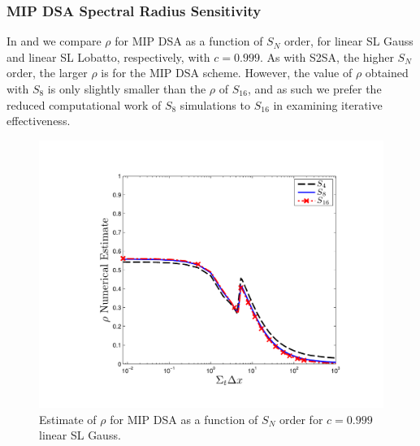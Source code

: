 \newpage

\subsubsection{MIP DSA Spectral Radius Sensitivity}


In  and  we compare $\rho$ for MIP DSA as a function of $S_N$ order, for linear SL Gauss and linear SL  Lobatto, respectively, with $c=0.999$.
As with S2SA, the higher $S_N$ order, the larger $\rho$ is for the MIP DSA scheme. 
However, the value of $\rho$ obtained with $S_8$ is only slightly smaller than the $\rho$ of $S_{16}$, and as such we prefer the reduced computational work of $S_8$ simulations to $S_{16}$ in examining iterative effectiveness.  
\begin{figure}[!htp]
\centering
\includegraphics[width=12cm]{chapter4_acceleration/Const_2_Constant_XS_sn_comparions_MIP_Gauss.pdf}
\caption{Estimate of $\rho$ for MIP DSA as a function of  $S_N$ order for $c=0.999$ linear SL Gauss.}
\label{fig:mip_gauss_as_fun_sn}
\end{figure}
